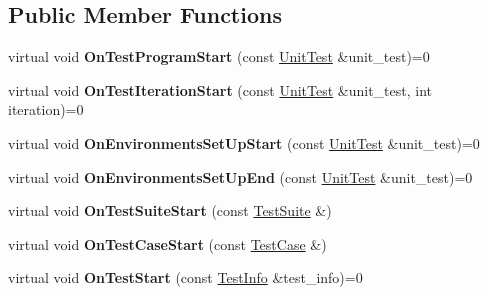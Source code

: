 \subsection*{Public Member Functions}
\begin{DoxyCompactItemize}
\item 
\mbox{\label{classtesting_1_1TestEventListener_a5f6c84f39851e8a603a2d2e10063816b}} 
virtual void {\bfseries On\+Test\+Program\+Start} (const \mbox{\hyperlink{classtesting_1_1UnitTest}{Unit\+Test}} \&unit\+\_\+test)=0
\item 
\mbox{\label{classtesting_1_1TestEventListener_a60cc09b7907cb329d152eb5e7133bdeb}} 
virtual void {\bfseries On\+Test\+Iteration\+Start} (const \mbox{\hyperlink{classtesting_1_1UnitTest}{Unit\+Test}} \&unit\+\_\+test, int iteration)=0
\item 
\mbox{\label{classtesting_1_1TestEventListener_aa6502e534919605be45f26a6daf9a40c}} 
virtual void {\bfseries On\+Environments\+Set\+Up\+Start} (const \mbox{\hyperlink{classtesting_1_1UnitTest}{Unit\+Test}} \&unit\+\_\+test)=0
\item 
\mbox{\label{classtesting_1_1TestEventListener_aaa1021d75f5dbf3f05c829c1cc520341}} 
virtual void {\bfseries On\+Environments\+Set\+Up\+End} (const \mbox{\hyperlink{classtesting_1_1UnitTest}{Unit\+Test}} \&unit\+\_\+test)=0
\item 
\mbox{\label{classtesting_1_1TestEventListener_a2726cc70dfda861f109355f1d9f09dfe}} 
virtual void {\bfseries On\+Test\+Suite\+Start} (const \mbox{\hyperlink{classtesting_1_1TestSuite}{Test\+Suite}} \&)
\item 
\mbox{\label{classtesting_1_1TestEventListener_ac48628c9f78d3e10bff77c7366e9e780}} 
virtual void {\bfseries On\+Test\+Case\+Start} (const \mbox{\hyperlink{classtesting_1_1TestSuite}{Test\+Case}} \&)
\item 
\mbox{\label{classtesting_1_1TestEventListener_ab4f6a0ca16ae75daf385b3b5914e1048}} 
virtual void {\bfseries On\+Test\+Start} (const \mbox{\hyperlink{classtesting_1_1TestInfo}{Test\+Info}} \&test\+\_\+info)=0

\end{DoxyCompactItemize}
